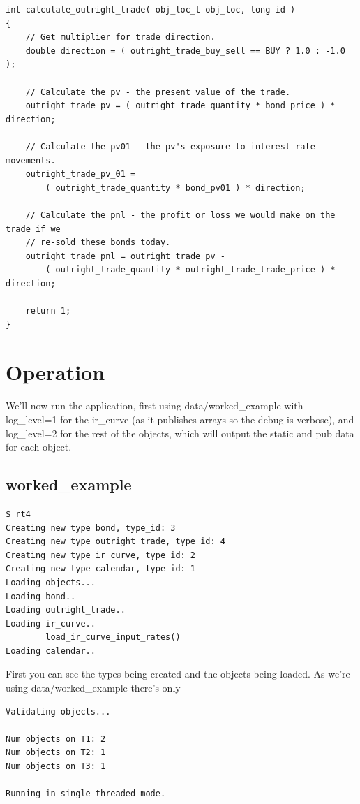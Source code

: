 \documentclass{report}
\begin{document}
\begin{verbatim}
int calculate_outright_trade( obj_loc_t obj_loc, long id )
{
    // Get multiplier for trade direction.
    double direction = ( outright_trade_buy_sell == BUY ? 1.0 : -1.0 );

    // Calculate the pv - the present value of the trade.
    outright_trade_pv = ( outright_trade_quantity * bond_price ) * direction;

    // Calculate the pv01 - the pv's exposure to interest rate movements.
    outright_trade_pv_01 = 
        ( outright_trade_quantity * bond_pv01 ) * direction;

    // Calculate the pnl - the profit or loss we would make on the trade if we 
    // re-sold these bonds today.
    outright_trade_pnl = outright_trade_pv - 
        ( outright_trade_quantity * outright_trade_trade_price ) * direction;

    return 1;
}
\end{verbatim}

\section{Operation}

We'll now run the application, first using data/worked_example with log_level=1 for the ir_curve (as it publishes arrays so the debug is verbose), and log_level=2 for the rest of the objects, which will output the static and pub data for each object.

\subsection{worked_example}
 
\begin{verbatim}
$ rt4
Creating new type bond, type_id: 3
Creating new type outright_trade, type_id: 4
Creating new type ir_curve, type_id: 2
Creating new type calendar, type_id: 1
Loading objects...
Loading bond..
Loading outright_trade..
Loading ir_curve..
        load_ir_curve_input_rates()
Loading calendar..

\end{verbatim}

First you can see the types being created and the objects being loaded. As we're using data/worked_example there's only

\begin{verbatim}
Validating objects...

Num objects on T1: 2
Num objects on T2: 1
Num objects on T3: 1

Running in single-threaded mode.
\end{verbatim}
\end{document}
